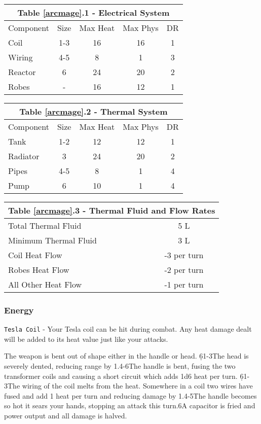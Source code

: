 \documentclass[a4paper]{article}
\begin{document}
\hspace{-0.6cm} \begin{tabular}[t]{|l c c c c|}
\toprule
\multicolumn{5}{|c|}{Table \ref{arcmage}.1 - Electrical System} \\
\midrule
Component & Size & Max Heat & Max Phys & DR \\
\midrule
Coil & 1-3 & 16 & 16 & 1 \\
Wiring & 4-5 & 8 & 1 & 3 \\
Reactor & 6 & 24 & 20 & 2 \\
Robes & - & 16 & 12 & 1 \\
\bottomrule
\end{tabular} \label{table:arcmage_electrical}
\begin{tabular}[t]{|l c c c c|}
\toprule
\multicolumn{5}{|c|}{Table \ref{arcmage}.2 - Thermal System} \\
\midrule
Component & Size & Max Heat & Max Phys & DR \\
\midrule
Tank & 1-2 & 12 & 12 & 1 \\
Radiator & 3 & 24 & 20 & 2 \\
Pipes & 4-5 & 8 & 1 & 4 \\
Pump & 6 & 10 & 1 & 4 \\
\bottomrule
\end{tabular} \label{table:arcmage_thermal}

\vspace{0.5cm}
\begin{tabular}{|l c|}
\toprule
\multicolumn{2}{|c|}{Table \ref{arcmage}.3 - Thermal Fluid and Flow Rates} \\
\midrule
Total Thermal Fluid & 5 L \\
Minimum Thermal Fluid & 3 L \\
\midrule
Coil Heat Flow & -3 per turn \\
Robes Heat Flow & -2 per turn \\
All Other Heat Flow & -1 per turn \\
\bottomrule
\end{tabular} \label{table:arcmage_fluidflow}

\subsubsection{Energy}

\texttt{Tesla Coil} - Your Tesla coil can be hit during combat. Any heat damage dealt will be added to its heat value just like your attacks. 

\ph
{The weapon is bent out of shape either in the handle or head. \newline
\d6{1-3}{The head is severely dented, reducing range by 1.}{4-6}{The handle is bent, fusing the two transformer coils and causing a short circuit which adds 1d6 heat per turn.}{}{}{}{}}
{\d6{1-3}{The wiring of the coil melts from the heat. Somewhere in a coil two wires have fused and add 1 heat per turn and reducing damage by 1.}{4-5}{The handle becomes so hot it sears your hands, stopping an attack this turn.}{6}{A capacitor is fried and power output and all damage is halved.}{}{}}
\end{document}
